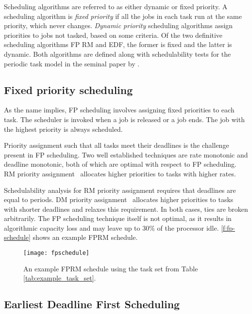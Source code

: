 Scheduling algorithms are referred to as either dynamic or fixed priority. A scheduling algorithm 
is \emph{fixed priority} if all the jobs in each task run at the same priority, which never changes. 
\emph{Dynamic priority} scheduling algorithms assign priorities to jobs not tasked, based on some criteria. 
Of the two definitive scheduling algorithms \acrlong{FP} \acrlong{RM} and \acrlong{EDF}, the former
is fixed and the latter is dynamic. Both algorithms are defined along with
schedulability tests for the periodic task model in the seminal paper by \citet{Liu_Layland_73}.

\subsection{Fixed priority scheduling}
\label{s:fp}

As the name implies, \gls{FP} scheduling involves assigning fixed priorities to each task.
The scheduler is invoked when a job is released or a job ends.
The job with the highest priority is always scheduled.

Priority assignment such that all tasks meet their deadlines is the challenge present in \gls{FP} scheduling.
Two well established techniques are rate monotonic and deadline monotonic, both of which are optimal with respect to \gls{FP} scheduling.
\Gls{RM} priority assignment~\citep{Liu_Layland_73} allocates higher priorities to tasks with higher rates.

Schedulability analysis for \gls{RM} priority assignment requires that deadlines are equal to periods.
\Gls{DM} priority assignment~\citep{Leung_Whitehead_82} allocates higher priorities to tasks with shorter deadlines and relaxes this requirement.
In both cases, ties are broken arbitrarily.
The \gls{FP} scheduling technique itself is not optimal, as it results in algorithmic capacity loss
and may leave up to 30\% of the processor idle.
\cref{f:fp-schedule} shows an example \gls{FP}\gls{RM} schedule.

\begin{figure}[h!tb]
	\begin{center}
		\leavevmode
		\texttt{[image: fpschedule]}
		\caption{An example FPRM schedule using the task set from Table \ref{tab:example_task_set}.}
		\label{fig:fp-schedule}
	\end{center}
\end{figure}

\subsection{Earliest Deadline First Scheduling}

